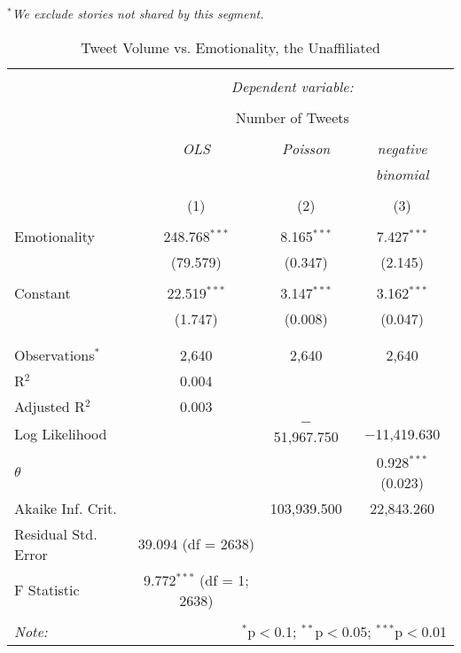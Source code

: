 \emph{$^{*}$We exclude stories not shared by this segment.}  
\newpage 
\begin{table}[!htbp] \centering 
  \caption{Tweet Volume vs. Emotionality, the Unaffiliated} 
      \label{} 
    \begin{tabular}{@{\extracolsep{5pt}}lccc} 
    \\[-1.8ex]\hline 
    \hline \\[-1.8ex] 
     & \multicolumn{3}{c}{\textit{Dependent variable:}} \\ 
    \cline{2-4} 
    \\[-1.8ex] & \multicolumn{3}{c}{Number of Tweets} \\ 
    \\[-1.8ex] & \textit{OLS} & \textit{Poisson} & \textit{negative} \\ 
     & \textit{} & \textit{} & \textit{binomial} \\ 
    \\[-1.8ex] & (1) & (2) & (3)\\ 
    \hline \\[-1.8ex] 
     Emotionality & 248.768$^{***}$ & 8.165$^{***}$ & 7.427$^{***}$ \\ 
      & (79.579) & (0.347) & (2.145) \\ 
      & & & \\ 
     Constant & 22.519$^{***}$ & 3.147$^{***}$ & 3.162$^{***}$ \\ 
      & (1.747) & (0.008) & (0.047) \\ 
      & & & \\ 
    \hline \\[-1.8ex] 
    Observations$^{*}$ & 2,640 & 2,640 & 2,640 \\ 
    R$^{2}$ & 0.004 &  &  \\ 
    Adjusted R$^{2}$ & 0.003 &  &  \\ 
    Log Likelihood &  & $-$51,967.750 & $-$11,419.630 \\ 
    $\theta$ &  &  & 0.928$^{***}$  (0.023) \\ 
    Akaike Inf. Crit. &  & 103,939.500 & 22,843.260 \\ 
    Residual Std. Error & 39.094 (df = 2638) &  &  \\ 
    F Statistic & 9.772$^{***}$ (df = 1; 2638) &  &  \\ 
    \hline 
    \hline \\[-1.8ex] 
    \textit{Note:}  & \multicolumn{3}{r}{$^{*}$p$<$0.1; $^{**}$p$<$0.05; $^{***}$p$<$0.01} \\ 
    \end{tabular} 
\end{table}
